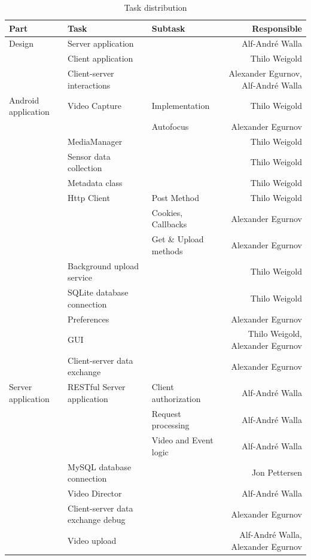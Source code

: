 \documentclass[conference]{IEEEtran}
\begin{document}
\begin{table}[t]
	\centering
	\renewcommand{\arraystretch}{1.5}
	\caption{Task distribution}
	\label{tab:task_distr}
	\begin{tabular}{lllr}
		\toprule
		Part & Task & Subtask & Responsible \\
		\midrule
		Design
			& Server application & & Alf-André Walla \\
			& Client application & & Thilo Weigold \\
			& Client-server interactions & & Alexander Egurnov, Alf-André Walla \\
		\midrule
		Android application
			& Video Capture & Implementation & Thilo Weigold \\
			&       & Autofocus & Alexander Egurnov \\
			& MediaManager & & Thilo Weigold \\
			& Sensor data collection & & Thilo Weigold \\
			& Metadata class & & Thilo Weigold \\
			& Http Client & Post Method & Thilo Weigold \\
			&       & Cookies, Callbacks & Alexander Egurnov \\
			&       & Get \& Upload methods & Alexander Egurnov \\
			& Background upload service & & Thilo Weigold \\
			& SQLite database connection & & Thilo Weigold \\
			& Preferences & & Alexander Egurnov \\
			& GUI & & Thilo Weigold, Alexander Egurnov \\
			& Client-server data exchange & & Alexander Egurnov \\
		\midrule
		Server application 
			& RESTful Server application & Client authorization & Alf-André Walla \\
			&       & Request processing & Alf-André Walla \\
			&       & Video and Event logic & Alf-André Walla \\
			& MySQL database connection & & Jon Pettersen \\
			& Video Director & & Alf-André Walla \\
			& Client-server data exchange debug & & Alexander Egurnov \\
			& Video upload & & Alf-André Walla, Alexander Egurnov \\

\end{tabular}
\end{table}
\end{document}
